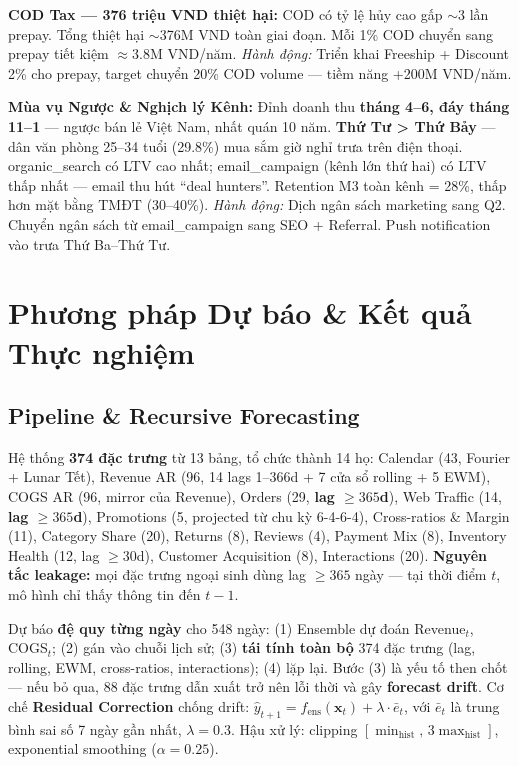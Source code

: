 \documentclass{article}
\begin{document}
\textbf{COD Tax --- 376 triệu VND thiệt hại:} COD có tỷ lệ hủy cao gấp $\sim$3 lần prepay. Tổng thiệt hại $\sim$376M VND toàn giai đoạn. Mỗi 1\% COD chuyển sang prepay tiết kiệm $\approx$3.8M VND/năm. \textit{Hành động:} Triển khai Freeship + Discount 2\% cho prepay, target chuyển 20\% COD volume --- tiềm năng +200M VND/năm.

\textbf{Mùa vụ Ngược \& Nghịch lý Kênh:} Đỉnh doanh thu \textbf{tháng 4--6, đáy tháng 11--1} --- ngược bán lẻ Việt Nam, nhất quán 10 năm. \textbf{Thứ Tư > Thứ Bảy} --- dân văn phòng 25--34 tuổi (29.8\%) mua sắm giờ nghỉ trưa trên điện thoại. organic\_search có LTV cao nhất; email\_campaign (kênh lớn thứ hai) có LTV thấp nhất --- email thu hút ``deal hunters''. Retention M3 toàn kênh = 28\%, thấp hơn mặt bằng TMĐT (30--40\%). \textit{Hành động:} Dịch ngân sách marketing sang Q2. Chuyển ngân sách từ email\_campaign sang SEO + Referral. Push notification vào trưa Thứ Ba--Thứ Tư.

\section{Phương pháp Dự báo \& Kết quả Thực nghiệm}

\subsection{Pipeline \& Recursive Forecasting}

Hệ thống \textbf{374 đặc trưng} từ 13 bảng, tổ chức thành 14 họ: Calendar (43, Fourier + Lunar Tết), Revenue AR (96, 14 lags 1--366d + 7 cửa sổ rolling + 5 EWM), COGS AR (96, mirror của Revenue), Orders (29, \textbf{lag $\ge 365$d}), Web Traffic (14, \textbf{lag $\ge 365$d}), Promotions (5, projected từ chu kỳ 6-4-6-4), Cross-ratios \& Margin (11), Category Share (20), Returns (8), Reviews (4), Payment Mix (8), Inventory Health (12, lag $\ge 30$d), Customer Acquisition (8), Interactions (20). \textbf{Nguyên tắc leakage:} mọi đặc trưng ngoại sinh dùng lag $\ge 365$ ngày --- tại thời điểm $t$, mô hình chỉ thấy thông tin đến $t-1$.

Dự báo \textbf{đệ quy từng ngày} cho 548 ngày: (1) Ensemble dự đoán Revenue$_t$, COGS$_t$; (2) gán vào chuỗi lịch sử; (3) \textbf{tái tính toàn bộ} 374 đặc trưng (lag, rolling, EWM, cross-ratios, interactions); (4) lặp lại. Bước (3) là yếu tố then chốt --- nếu bỏ qua, 88 đặc trưng dẫn xuất trở nên lỗi thời và gây \textbf{forecast drift}. Cơ chế \textbf{Residual Correction} chống drift: $\hat{y}_{t+1} = f_{\text{ens}}(\mathbf{x}_t) + \lambda \cdot \bar{e}_t$, với $\bar{e}_t$ là trung bình sai số 7 ngày gần nhất, $\lambda=0.3$. Hậu xử lý: clipping $[\min_\text{hist},\,3\max_\text{hist}]$, exponential smoothing ($\alpha=0.25$).
\end{document}
